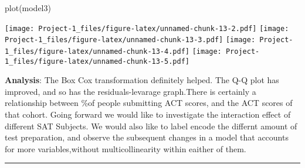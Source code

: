 \documentclass[
]{article}
\newenvironment{Shaded}{\begin{snugshade}}{\end{snugshade}}
\newcommand{\FunctionTok}[1]{\textcolor[rgb]{0.00,0.00,0.00}{#1}}
\newcommand{\NormalTok}[1]{#1}
\begin{document}
\begin{Shaded}
\begin{Highlighting}[]
\FunctionTok{plot}\NormalTok{(model3)}
\end{Highlighting}
\end{Shaded}

\texttt{[image: Project-1\_files/figure-latex/unnamed-chunk-13-2.pdf]}
\texttt{[image: Project-1\_files/figure-latex/unnamed-chunk-13-3.pdf]}
\texttt{[image: Project-1\_files/figure-latex/unnamed-chunk-13-4.pdf]}
\texttt{[image: Project-1\_files/figure-latex/unnamed-chunk-13-5.pdf]}

\textbf{Analysis}: The Box Cox transformation definitely helped. The Q-Q
plot has improved, and so has the residuals-levarage graph.There is
certainly a relationship between \%of people submitting ACT scores, and
the ACT scores of that cohort. Going forward we would like to
investigate the interaction effect of different SAT Subjects. We would
also like to label encode the differnt amount of test preparation, and
observe the subsequent changes in a model that accounts for more
variables,without multicollinearity within eaither of them.

\begin{center}\rule{0.5\linewidth}{0.5pt}\end{center}
\end{document}
